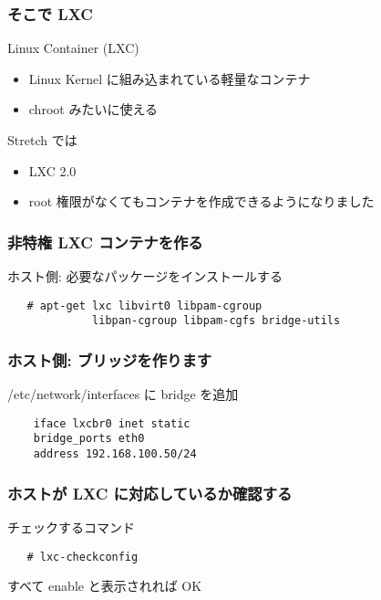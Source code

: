 \documentclass[cjk,dvipdfmx,12pt,compress,%
hyperref={bookmarks=true,bookmarksnumbered=true,bookmarksopen=false,%
colorlinks=false,%
pdftitle={第 120 回 関西 Debian 勉強会},%
pdfauthor={倉敷・のがた・佐々木・かわだ・おおつき},%
pdfsubject={資料},%
}]{beamer}
\begin{document}
\begin{frame}[fragile]
  \frametitle{そこで LXC}
   \begin{block}{Linux Container (LXC)}
	\begin{itemize}
    \item Linux Kernel に組み込まれている軽量なコンテナ
    \item chroot みたいに使える  
    \end{itemize} 
  \end{block}

   \begin{block}{Stretch では}
	\begin{itemize}
    \item LXC 2.0  
	\item root 権限がなくてもコンテナを作成できるようになりました 
    \end{itemize} 
  \end{block}
\end{frame}

\begin{frame}[fragile]
  \frametitle{非特権 LXC コンテナを作る}
  \begin{block}{ホスト側: 必要なパッケージをインストールする}
   \begin{verbatim}
   # apt-get lxc libvirt0 libpam-cgroup 
             libpan-cgroup libpam-cgfs bridge-utils
   \end{verbatim}
  \end{block}
\end{frame}

\begin{frame}[fragile]
  \frametitle{ホスト側: ブリッジを作ります}
  \begin{block}{/etc/network/interfaces に bridge を追加}
   \begin{verbatim}
    iface lxcbr0 inet static
    bridge_ports eth0
    address 192.168.100.50/24
   \end{verbatim}
  \end{block}
\end{frame}

\begin{frame}[fragile]
  \frametitle{ホストが LXC に対応しているか確認する}
  \begin{block}{チェックするコマンド}
   \begin{verbatim}
   # lxc-checkconfig
   \end{verbatim}
   すべて enable と表示されれば OK
  \end{block}
\end{frame}
\end{document}

